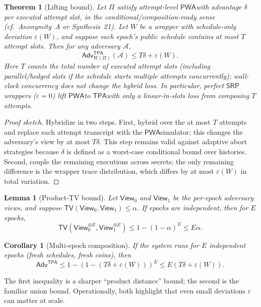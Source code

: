\documentclass[11pt]{article}
\newtheorem{theorem}{Theorem}
\newtheorem{lemma}{Lemma}
\newtheorem{corollary}{Corollary}
\newcommand{\Adv}{\ensuremath{\mathsf{Adv}}}
\newcommand{\PWA}{\ensuremath{\mathsf{PWA}}}
\newcommand{\TPA}{\ensuremath{\mathsf{TPA}}}
\newcommand{\SRP}{\ensuremath{\mathsf{SRP}}}
\newcommand{\tv}{\ensuremath{\mathsf{TV}}}
\begin{document}
\begin{theorem}[Lifting bound]
Let $\Pi$ satisfy attempt-level \PWA with advantage $\delta$ \emph{per executed attempt slot}, in the conditional/composition-ready sense (cf.\ Anonymity~A or Synthesis~21).\cite{series:oddsinflation,series:condcert}
Let $W$ be a wrapper with schedule-only deviation $\varepsilon(W)$, and suppose each epoch's public schedule contains at most $T$ attempt slots.
Then for any adversary $\mathcal{A}$,
\[\Adv^{\TPA}_{W(\Pi)}(\mathcal{A}) \le T\delta + \varepsilon(W).\]
Here $T$ counts the total number of executed attempt slots (including parallel/hedged slots if the schedule starts multiple attempts concurrently); wall-clock concurrency does not change the hybrid loss.
In particular, perfect \SRP wrappers ($\varepsilon=0$) lift \PWA to \TPA with only a linear-in-slots loss from composing $T$ attempts.
\end{theorem}

\begin{proof}[Proof sketch]
Hybridize in two steps.
First, hybrid over the at most $T$ attempts and replace each attempt transcript with the \PWA simulator; this changes the adversary's view by at most $T\delta$.
This step remains valid against adaptive abort strategies because $\delta$ is defined as a worst-case conditional bound over histories.
Second, couple the remaining executions across secrets; the only remaining difference is the wrapper trace distribution, which differs by at most $\varepsilon(W)$ in total variation.
\end{proof}

\begin{lemma}[Product-TV bound]
Let $\mathsf{View}_{0}$ and $\mathsf{View}_{1}$ be the per-epoch adversary views, and suppose
$\tv(\mathsf{View}_{0},\mathsf{View}_{1})\le \alpha$.
If epochs are independent, then for $E$ epochs,
\[\tv(\mathsf{View}_{0}^{\otimes E},\mathsf{View}_{1}^{\otimes E})\le 1-(1-\alpha)^E\le E\alpha.\]
\end{lemma}

\begin{corollary}[Multi-epoch composition]
If the system runs for $E$ independent epochs (fresh schedules, fresh coins), then
\[\Adv^{\TPA}\le 1-(1-(T\delta+\varepsilon(W)))^E\le E(T\delta+\varepsilon(W)).\]
\end{corollary}

The first inequality is a sharper ``product distance'' bound; the second is the familiar union bound.
Operationally, both highlight that even small deviations $\varepsilon$ can matter at scale.
\end{document}
